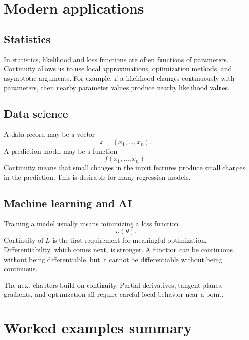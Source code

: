 \documentclass[11pt]{article}
\begin{document}
\section{Modern applications}

\subsection*{Statistics}
In statistics, likelihood and loss functions are often functions of parameters. Continuity allows us to use local approximations, optimization methods, and asymptotic arguments. For example, if a likelihood changes continuously with parameters, then nearby parameter values produce nearby likelihood values.

\subsection*{Data science}
A data record may be a vector
\[
x=(x_1,\ldots,x_n).
\]
A prediction model may be a function
\[
f(x_1,\ldots,x_n).
\]
Continuity means that small changes in the input features produce small changes in the prediction. This is desirable for many regression models.

\subsection*{Machine learning and AI}
Training a model usually means minimizing a loss function
\[
L(\theta).
\]
Continuity of $L$ is the first requirement for meaningful optimization. Differentiability, which comes next, is stronger. A function can be continuous without being differentiable, but it cannot be differentiable without being continuous.

\begin{importantbox}
The next chapters build on continuity. Partial derivatives, tangent planes, gradients, and optimization all require careful local behavior near a point.
\end{importantbox}

\section{Worked examples summary}
\end{document}
